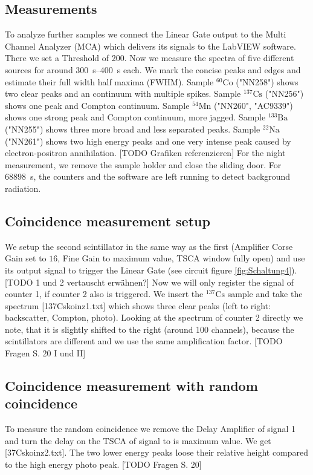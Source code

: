 \subsection{Measurements}
%
To analyze further samples we connect the Linear Gate output to the Multi Channel Analyzer (MCA) which delivers its signals to the LabVIEW software.
There we set a Threshold of 200.
%
Now we measure the spectra of five different sources for around \SIrange{300}{400}{\second} each.
We mark the concise peaks and edges and estimate their full width half maxima (FWHM).
%
Sample $^{60}\text{Co}$ ("NN258") shows two clear peaks and an continuum with multiple spikes.
Sample $^{137}\text{Cs}$ ("NN256") shows one peak and Compton continuum.
Sample $^{54}\text{Mn}$ ("NN260", "AC9339") shows one strong peak and Compton continuum, more jagged.
Sample $^{133}\text{Ba}$ ("NN255") shows three more broad and less separated peaks.
Sample $^{22}\text{Na}$ ("NN261") shows two high energy peaks and one very intense peak caused by electron-positron annihilation.
[TODO Grafiken referenzieren]
%
For the night measurement, we remove the sample holder and close the sliding door.
For \SI{68898}{\second}, the counters and the software are left running to detect background radiation.
%
\subsection{Coincidence measurement setup}
%
We setup the second scintillator in the same way as the first (Amplifier Corse Gain set to $16$, Fine Gain to maximum value, TSCA window fully open) and use its output signal to trigger the Linear Gate (see circuit figure \ref{fig:Schaltung4}).
[TODO 1 und 2 vertauscht erwähnen?]
Now we will only register the signal of counter 1, if counter 2 also is triggered.
%
We insert the $^{137}\text{Cs}$ sample and take the spectrum [137Cskoinz1.txt] which shows three clear peaks (left to right: backscatter, Compton, photo).
%
Looking at the spectrum of counter 2 directly we note, that it is slightly shifted to the right (around 100 channels), because the scintillators are different and we use the same amplification factor.
[TODO Fragen S. 20 I und II]
%
\subsection{Coincidence measurement with random coincidence}
%
To measure the random coincidence we remove the Delay Amplifier of signal 1 and turn the delay on the TSCA of signal to is maximum value.
We get [37Cskoinz2.txt].
The two lower energy peaks loose their relative height compared to the high energy photo peak.
[TODO Fragen S. 20]
%
